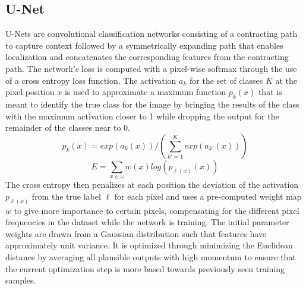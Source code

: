 \documentclass{Configuration_Files/PoliMi3i_thesis}
\begin{document}
\subsection{U-Net}
U-Nets are convolutional classification networks consisting of a contracting path to capture context followed 
by a symmetrically expanding path that enables localization \cite{OlR15} and concatenates the corresponding 
features from the contracting path. The network’s loss is computed with a pixel-wise softmax through the 
use of a cross entropy loss function. The activation $a_{k}$ for the set of classes $K$ at the pixel position 
$x$ is used to approximate a maximum function $p_{k}(x)$ that is meant to identify the true class for 
the image by bringing the results of the class with the maximum activation closer to 1 
while dropping the output for the remainder of the classes near to 0.
\begin{equation} \label{eq:unetact}
p_{k}(x) = exp(a_{k}(x))/(\sum_{k'=1}^K exp(a_{k'}(x)))
\end{equation}
\begin{equation} \label{eq:unetloss}
E = \sum_{x\in\omega} w(x)log(p_{\ell(x)}(x))
\end{equation}
The cross entropy then penalizes at each position the deviation of the activation $p_{\ell(x)}$ 
from the true label $\ell$ for each pixel and uses a pre-computed weight map $w$ to give more 
importance to certain pixels, compensating for the different pixel frequencies in the dataset 
while the network is training. The initial parameter weights are drawn from a Gaussian distribution 
such that features have approximately unit variance. It is optimized through minimizing the Euclidean 
distance by averaging all plausible outputs with high momentum to ensure that the current optimization 
step is more based towards previously seen training samples.
\end{document}

